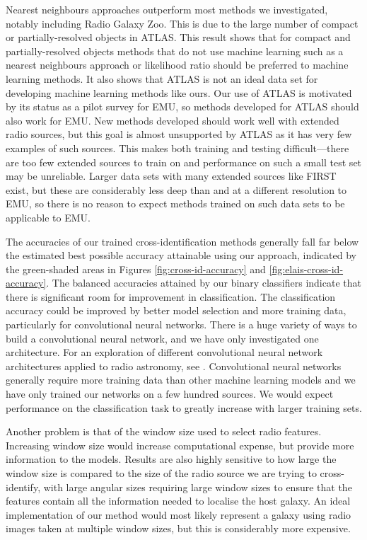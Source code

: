 \documentclass[11pt, a4paper]{book}
\begin{document}
  Nearest neighbours approaches outperform most methods we investigated,
  notably including Radio Galaxy Zoo. This is due to the large number of
  compact or partially-resolved objects in ATLAS. This result shows that for
  compact and partially-resolved objects methods that do not use machine
  learning such as a nearest neighbours approach or likelihood ratio
  \citep{weston18lrpy} should be preferred to machine learning methods. It
  also shows that ATLAS is not an ideal data set for developing machine
  learning methods like ours. Our use of ATLAS is motivated by its status as a
  pilot survey for EMU, so methods developed for ATLAS should also work for
  EMU. New methods developed should work well with extended radio sources, but
  this goal is almost unsupported by ATLAS as it has very few examples of such
  sources. This makes both training and testing difficult---there are too
  few extended sources to train on and performance on such a small test set
  may be unreliable. Larger data sets with many extended sources like FIRST
  exist, but these are considerably less deep than and at a different
  resolution to EMU, so there is no reason to expect methods trained on such
  data sets to be applicable to EMU.

  The accuracies of our trained cross-identification methods generally fall
  far below the estimated best possible accuracy attainable using our approach,
  indicated by the green-shaded areas in Figures \ref{fig:cross-id-accuracy} and
  \ref{fig:elais-cross-id-accuracy}. The balanced accuracies attained by our
  binary classifiers indicate that there is significant room for improvement
  in classification. The classification accuracy could be improved by better
  model selection and more training data, particularly for convolutional
  neural networks. There is a huge variety of ways to build a convolutional
  neural network, and we have only investigated one architecture. For an
  exploration of different convolutional neural network architectures applied
  to radio astronomy, see \citet{lukic18compact}. Convolutional neural
  networks generally require more training data than other machine learning
  models and we have only trained our networks on a few hundred sources. We
  would expect performance on the classification task to greatly increase
  with larger training sets.

  Another problem is that of the window size used to select radio features.
  Increasing window size would increase computational expense, but provide
  more information to the models. Results are also highly sensitive to how
  large the window size is compared to the size of the radio source we are
  trying to cross-identify, with large angular sizes requiring large window
  sizes to ensure that the features contain all the information needed to
  localise the host galaxy. An ideal implementation of our method would most
  likely represent a galaxy using radio images taken at multiple window
  sizes, but this is considerably more expensive.
\end{document}
